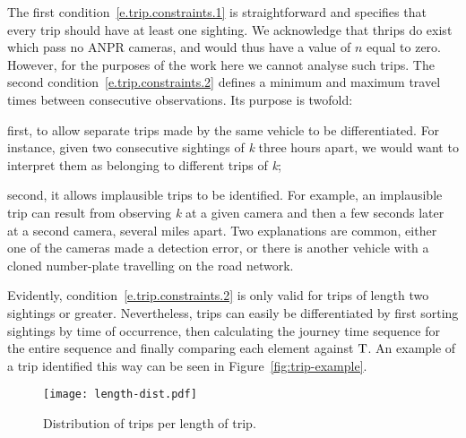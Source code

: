 The first condition~\ref{e.trip.constraints.1} is straightforward and specifies that every trip should have at least one sighting. We acknowledge that thrips do exist which pass no ANPR cameras, and would thus have a value of $n$ equal to zero. However, for the purposes of the work here we cannot analyse such trips. The second condition~\ref{e.trip.constraints.2} defines a minimum and maximum travel times between consecutive observations. Its purpose is twofold:
\begin{enumerate*}[label=(\roman*)]
  \item first, to allow separate trips made by the same vehicle to be differentiated. For instance, given two consecutive sightings of \emph{k} three hours apart, we would want to interpret them as belonging to different trips of \emph{k};
  \item second, it allows implausible trips to be identified. For example, an implausible trip can result from observing \emph{k} at a given camera and then a few seconds later at a second camera, several miles apart. Two explanations are common, either one of the cameras made a detection error, or there is another vehicle with a cloned number-plate travelling on the road network.
\end{enumerate*} Evidently, condition~\ref{e.trip.constraints.2} is only valid for trips of length two sightings or greater. Nevertheless, trips can easily be differentiated by first sorting sightings by time of occurrence, then calculating the journey time sequence for the entire sequence and finally comparing each element against $\mathrm{T}$. An example of a trip identified this way can be seen in Figure~\ref{fig:trip-example}.

\begin{figure}[t]
  \centering
  \texttt{[image: length-dist.pdf]}
  \caption{Distribution of trips per length of trip.}
  \label{fig:length-dist}  
\end{figure}

